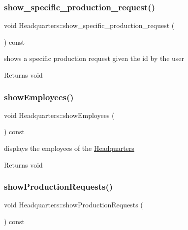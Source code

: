 \subsubsection{\texorpdfstring{show\+\_\+specific\+\_\+production\+\_\+request()}{show\_specific\_production\_request()}}
{\footnotesize\ttfamily void Headquarters\+::show\+\_\+specific\+\_\+production\+\_\+request (\begin{DoxyParamCaption}{ }\end{DoxyParamCaption}) const}



shows a specific production request given the id by the user 

\begin{DoxyReturn}{Returns}
void 
\end{DoxyReturn}
\mbox{\label{class_headquarters_a3dacd649a7dce9de39328bf45fdd79d8}} 
\subsubsection{\texorpdfstring{show\+Employees()}{showEmployees()}}
{\footnotesize\ttfamily void Headquarters\+::show\+Employees (\begin{DoxyParamCaption}{ }\end{DoxyParamCaption}) const}



displays the employees of the \hyperlink{class_headquarters}{Headquarters} 

\begin{DoxyReturn}{Returns}
void 
\end{DoxyReturn}
\mbox{\label{class_headquarters_af1bdf66c16fe6b211fffe03a81a69ec2}} 
\subsubsection{\texorpdfstring{show\+Production\+Requests()}{showProductionRequests()}}
{\footnotesize\ttfamily void Headquarters\+::show\+Production\+Requests (\begin{DoxyParamCaption}{ }\end{DoxyParamCaption}) const}




